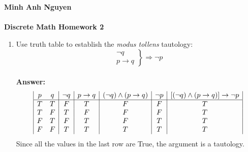\documentclass[12pt]{article}
\begin{document}
\textbf{{\Large Minh Anh Nguyen }}\\~\\
\textbf{{\Large Discrete Math Homework 2}}

\hrulefill

\begin{enumerate}

\item %
  Use truth table to establish the \textit{modus tollens} tautology:
    \[ \left. \begin{array}{r}
      \neg q \\
    p \rightarrow q \end{array} \right\} \Longrightarrow \neg p\] \\
    \textbf{Answer: }
    \begin{displaymath}
      \begin{array}{|c c|c|c|c|c|c|}
      p & q & \neg q & p \rightarrow q & (\neg q) \wedge (p \rightarrow q) & \neg p & [(\neg q) \wedge (p \rightarrow q)] \rightarrow \neg p\\%
      \hline %
      T & T & F & T & F & F & T \\
      T & F & T & F & F & F & T \\
      F & T & F & T & F & T & T \\
      F & F & T & T & T & T & T \\
      \end{array}
      \end{displaymath}
    Since all the values in the last row are True, the argument is a tautology.


\end{enumerate}
\end{document}
